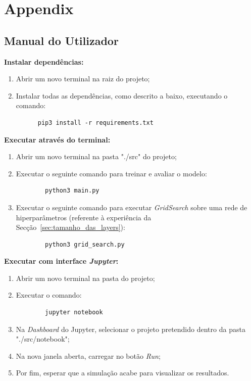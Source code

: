 \documentclass[]{article}
\begin{document}
\newpage

\appendix
\section{Appendix}
\label{sec:appendix}

\subsection{Manual do Utilizador}
\label{sec:manual}
\textbf{Instalar dependências:}
 \begin{enumerate}
  \item Abrir um novo terminal na raiz do projeto;
  \item Instalar todas as dependências, como descrito a baixo, executando o comando:
    \begin{lstlisting}
      pip3 install -r requirements.txt
    \end{lstlisting}
\end{enumerate}

\textbf{Executar através do terminal:}
\begin{enumerate}
	\item Abrir um novo terminal na pasta "./src" do projeto;
  	\item Executar o seguinte comando para treinar e avaliar o modelo:
    \begin{lstlisting}
		python3 main.py
	\end{lstlisting}
    
    \item Executar o seguinte comando para executar \textit{GridSearch} sobre uma rede de hiperparâmetros (referente à experiência da Secção~\ref{sec:tamanho_das_layers}):
    \begin{lstlisting}
		python3 grid_search.py
	\end{lstlisting}
    
\end{enumerate}
  
\textbf{Executar com interface \textit{Jupyter}:}
\begin{enumerate}
  \item Abrir um novo terminal na pasta do projeto;
  \item Executar o comando:
	\begin{lstlisting}
		jupyter notebook
	\end{lstlisting}
  \item Na \textit{Dashboard} do Jupyter, selecionar o projeto pretendido dentro da pasta "./src/notebook";
  \item Na nova janela aberta, carregar no botão \textit{Run};
  \item Por fim, esperar que a simulação acabe para visualizar os resultados.
\end{enumerate}
  	
\end{document}
